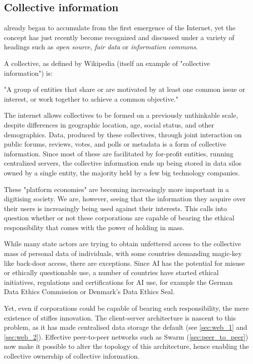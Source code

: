 \subsection{Collective information \statusgreen}\label{sec:collective_information}

 already began to accumulate from the first emergence of the Internet, yet the concept has just recently become recognized and discussed under a variety of headings such as  \emph{open source}, \emph{fair data} or \emph{information commons}.

A collective, as defined by Wikipedia (itself an example of "collective information") is:
\begin{displayquote}
"A group of entities that share or are motivated by at least one common issue or interest, or work together to achieve a common objective." 
\end{displayquote}
The internet allows collectives to be formed on a previously unthinkable scale, despite differences in geographic location, age, social status, and other demographics. Data,  produced by these collectives, through joint interaction on public forums, reviews, votes, and polls or metadata is a form of collective information. Since most of these are facilitated by for-profit entities, running centralized servers, the collective information ends up being stored in data silos owned by a single entity, the majority held by a few big technology companies.

These "platform economies" are becoming increasingly more important in a digitising society. We are, however, seeing that the information they acquire over their users is increasingly being used against their interests. This calls into question whether or not these corporations are capable of bearing the ethical responsibility that comes with the power of holding  in mass.

While many state actors are trying to obtain unfettered access to the collective mass of personal data of individuals, with some countries demanding magic-key like back-door access, there are exceptions. Since AI has the potential for misuse or ethically questionable use, a number of countries have started ethical initiatives, regulations and certifications for AI use, for example the German Data Ethics Commission or Denmark's Data Ethics Seal. 

Yet, even if corporations could be capable of bearing such responsibility, the mere existence of  stifles innovation. The client-server architecture is nascent to this problem, as it has made centralised data storage the default (see \ref{sec:web_1} and \ref{sec:web_2}). Effective peer-to-peer networks such as Swarm (\ref{sec:peer_to_peer}) now make it possible to alter the topology of this architecture, hence enabling the collective ownership of collective information. 



